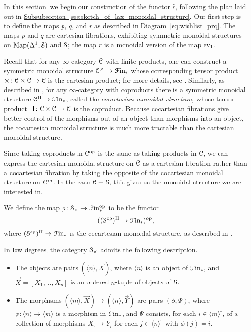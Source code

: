 \documentclass[main.tex]{subfiles}
\begin{document}
In this section, we begin our construction of the functor $\hat{r}$, following the plan laid out in \hyperref[sss:sketch_of_lax_monoidal_structure]{Subsubsection~\ref*{sss:sketch_of_lax_monoidal_structure}}. Our first step is to define the maps $p$, $q$, and $r$ as described in \hyperref[eq:wishlist_prq]{Diagram~\ref*{eq:wishlist_prq}}. The maps $p$ and $q$ are cartesian fibrations, exhibiting symmetric monoidal structures on $\Map(\Delta^{1}, \S)$ and $\S$; the map $r$ is a monoidal version of the map $\ev_{1}$.

Recall that for any $\infty$-category $\category{C}$ with finite products, one can construct a symmetric monoidal structure $\category{C}^{\times} \to \Finp$ whose corresponding tensor product $\times\colon \category{C} \times \category{C} \to \category{C}$ is the cartesian product; for more details, see \cite[Sec.\ 2.4.1]{luriehigheralgebra}. Similarly, as described in \cite[Sec.\ 2.4.2]{luriehigheralgebra}, for any $\infty$-category with coproducts there is a symmetric monoidal structure $\category{C}^{\amalg} \to \Finp$, called the \emph{cocartesian monoidal structure,} whose tensor product $\amalg\colon \category{C} \times \category{C} \to \category{C}$ is the coproduct. Because cocartesian fibrations give better control of the morphisms out of an object than morphisms into an object, the cocartesian monoidal structure is much more tractable than the cartesian monoidal structure.

Since taking coproducts in $\category{C}\op$ is the same as taking products in $\category{C}$, we can express the cartesian monoidal structure on $\category{C}$ as a cartesian fibration rather than a cocartesian fibration by taking the opposite of the cocartesian monoidal structure on $\category{C}\op$. In the case $\category{C} = \S$, this gives us the monoidal structure we are interested in.

\begin{definition}
  We define the map $p\colon \S_{\times} \to \Finp\op$ to be the functor
  \begin{equation*}
    ((\S\op)^{\amalg} \to \Finp)\op,
  \end{equation*}
  where $(\S\op)^{\amalg} \to \Finp$ is the cocartesian monoidal structure, as described in \cite[Sec.\ 2.4.2]{luriehigheralgebra}.
\end{definition}

In low degrees, the category $\S_{\times}$ admits the following description.
\begin{itemize}
  \item The objects are pairs $(\langle n \rangle, \vec{X})$, where $\langle n \rangle$ is an object of $\Finp$, and $\vec{X} = [X_{1}, \ldots, X_{n}]$ is an ordered $n$-tuple of objects of $\S$.

  \item The morphisms $(\langle m \rangle, \vec{X}) \to (\langle n \rangle, \vec{Y})$ are pairs $(\phi, \Psi)$, where $\phi\colon \langle n \rangle \to \langle m \rangle$ is a morphism in $\Finp$, and $\Psi$ consists, for each $i \in \langle m \rangle^{\circ}$, of a collection of morphisms $X_{i} \to Y_{j}$ for each $j \in \langle n \rangle^{\circ}$ with $\phi(j) = i$.
\end{itemize}
\end{document}
